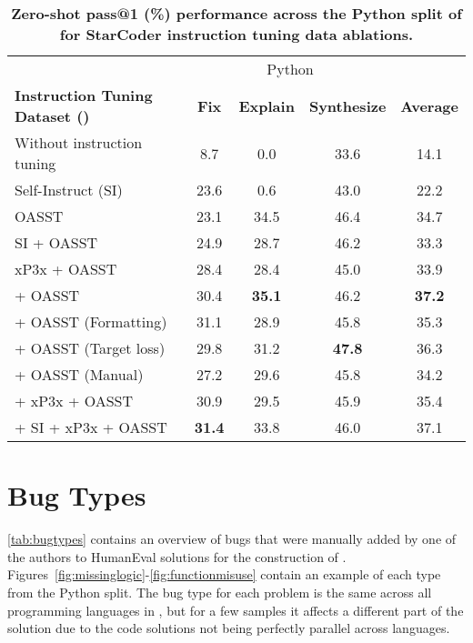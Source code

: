 \begin{table*}[htbp]
    \centering
\begin{tabular}{l|ccc|c}
    \toprule
    & \multicolumn{3}{c|}{\eval{} Python} & \\
    \textbf{Instruction Tuning Dataset ()} & \textbf{Fix} & \textbf{Explain} & \textbf{Synthesize} & \textbf{Average} \\
    \midrule
Without instruction tuning & 8.7 & 0.0 & 33.6 & 14.1 \\    
    \midrule
    Self-Instruct (SI) & 23.6 & 0.6 & 43.0 & 22.2 \\
    OASST & 23.1 & 34.5 & 46.4 & 34.7 \\
    SI + OASST & 24.9 & 28.7 & 46.2 & 33.3 \\
    xP3x + OASST & 28.4 & 28.4 & 45.0 & 33.9 \\
    \dataft{} + OASST & 30.4 & \textbf{35.1} & 46.2 & \textbf{37.2} \\
    \dataft{} + OASST (Formatting) & 31.1 & 28.9 & 45.8 & 35.3  \\
    \dataft{} + OASST (Target loss) & 29.8 & 31.2 & \textbf{47.8} & 36.3 \\
    \dataft{} + OASST (Manual) & 27.2 & 29.6 & 45.8 & 34.2 \\
    \dataft{} + xP3x + OASST & 30.9 & 29.5 & 45.9 & 35.4 \\
    \dataft{} + SI + xP3x + OASST & \textbf{31.4} & 33.8 & 46.0 & 37.1 \\
    \bottomrule
    \end{tabular}
\caption{\textbf{Zero-shot pass@1 (\%) performance across the Python split of \eval{} for StarCoder instruction tuning data ablations.}}
    \label{tab:ablations}
\end{table*}

\FloatBarrier


\section{\evalf{} Bug Types}
\label{sec:bugs}

\autoref{tab:bugtypes} contains an overview of bugs that were manually added by one of the authors to HumanEval solutions for the construction of \evalf{}. Figures~\ref{fig:missinglogic}-\ref{fig:functionmisuse} contain an example of each type from the Python split. The bug type for each problem is the same across all programming languages in \evalf{}, but for a few samples it affects a different part of the solution due to the code solutions not being perfectly parallel across languages.

